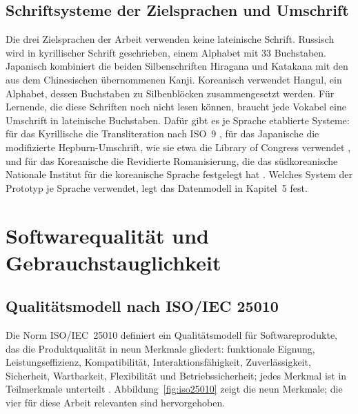 \documentclass[12pt,a4paper]{scrreprt}
\begin{document}
\subsection{Schriftsysteme der Zielsprachen und Umschrift}
Die drei Zielsprachen der Arbeit verwenden keine lateinische Schrift. Russisch wird in kyrillischer Schrift geschrieben, einem Alphabet mit 33 Buchstaben. Japanisch kombiniert die beiden Silbenschriften Hiragana und Katakana mit den aus dem Chinesischen übernommenen Kanji. Koreanisch verwendet Hangul, ein Alphabet, dessen Buchstaben zu Silbenblöcken zusammengesetzt werden. Für Lernende, die diese Schriften noch nicht lesen können, braucht jede Vokabel eine Umschrift in lateinische Buchstaben. Dafür gibt es je Sprache etablierte Systeme: für das Kyrillische die Transliteration nach ISO~9 \cite{iso9}, für das Japanische die modifizierte Hepburn-Umschrift, wie sie etwa die Library of Congress verwendet \cite{locjapanese}, und für das Koreanische die Revidierte Romanisierung, die das südkoreanische Nationale Institut für die koreanische Sprache festgelegt hat \cite{nikl}. Welches System der Prototyp je Sprache verwendet, legt das Datenmodell in Kapitel~5 fest.

\section{Softwarequalität und Gebrauchstauglichkeit}

\subsection{Qualitätsmodell nach ISO/IEC 25010}
Die Norm ISO/IEC~25010 definiert ein Qualitätsmodell für Softwareprodukte, das die Produktqualität in neun Merkmale gliedert: funktionale Eignung, Leistungseffizienz, Kompatibilität, Interaktionsfähigkeit, Zuverlässigkeit, Sicherheit, Wartbarkeit, Flexibilität und Betriebssicherheit; jedes Merkmal ist in Teilmerkmale unterteilt \cite[Abschn.~4.1]{iso25010}. Abbildung~\ref{fig:iso25010} zeigt die neun Merkmale; die vier für diese Arbeit relevanten sind hervorgehoben.
\end{document}
